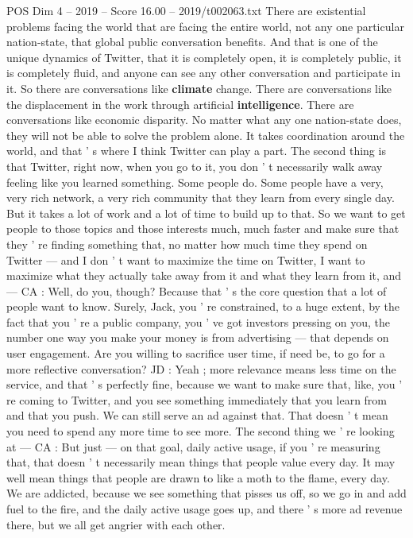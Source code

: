 \begin{textsample}{POS Dim 4 – 2019 – Score 16.00 – 2019/t002063.txt}
There are existential problems facing the world that are facing the entire world, not any one particular nation-state, that global public conversation benefits.
And that is one of the unique dynamics of Twitter, that it is completely open, it is completely public, it is completely fluid, and anyone can see any other conversation and participate in it.
So there are conversations like \textbf{climate} change.
There are conversations like the displacement in the work through artificial \textbf{intelligence}.
There are conversations like economic disparity.
No matter what any one nation-state does, they will not be able to solve the problem alone.
It takes coordination around the world, and that ' s where I think Twitter can play a part.
The second thing is that Twitter, right now, when you go to it, you don ' t necessarily walk away feeling like you learned something.
Some people do.
Some people have a very, very rich network, a very rich community that they learn from every single day.
But it takes a lot of work and a lot of time to build up to that.
So we want to get people to those topics and those interests much, much faster and make sure that they ' re finding something that, no matter how much time they spend on Twitter — and I don ' t want to maximize the time on Twitter, I want to maximize what they actually take away from it and what they learn from it, and — CA : Well, do you, though?
Because that ' s the core question that a lot of people want to know.
Surely, Jack, you ' re constrained, to a huge extent, by the fact that you ' re a public company, you ' ve got investors pressing on you, the number one way you make your money is from advertising — that depends on user engagement.
Are you willing to sacrifice user time, if need be, to go for a more reflective conversation?
JD : Yeah ; more relevance means less time on the service, and that ' s perfectly fine, because we want to make sure that, like, you ' re coming to Twitter, and you see something immediately that you learn from and that you push.
We can still serve an ad against that.
That doesn ' t mean you need to spend any more time to see more.
The second thing we ' re looking at — CA : But just — on that goal, daily active usage, if you ' re measuring that, that doesn ' t necessarily mean things that people value every day.
It may well mean things that people are drawn to like a moth to the flame, every day.
We are addicted, because we see something that pisses us off, so we go in and add fuel to the fire, and the daily active usage goes up, and there ' s more ad revenue there, but we all get angrier with each other.

\end{textsample}
